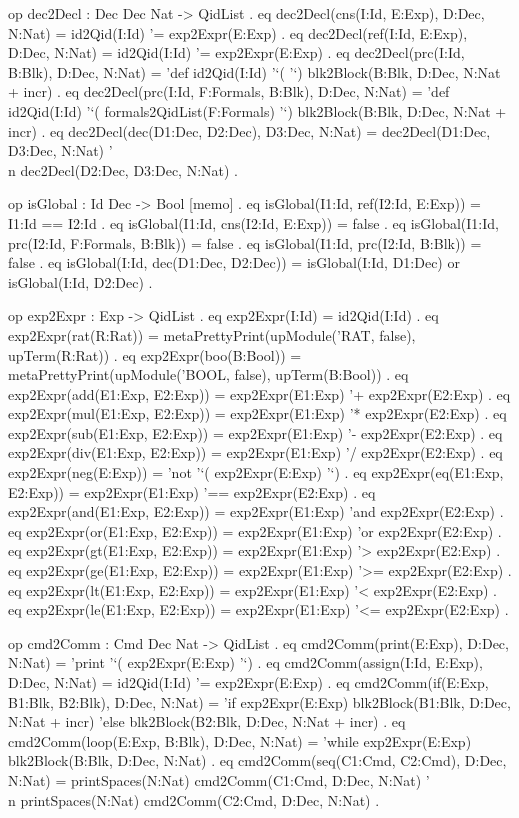 \documentclass{llncs}%
\begin{document}
    op dec2Decl : Dec Dec Nat -> QidList .
    eq dec2Decl(cns(I:Id, E:Exp), D:Dec, N:Nat) = 
       id2Qid(I:Id) '= exp2Expr(E:Exp) .
    eq dec2Decl(ref(I:Id, E:Exp), D:Dec, N:Nat) = 
       id2Qid(I:Id) '= exp2Expr(E:Exp) .
    eq dec2Decl(prc(I:Id, B:Blk), D:Dec, N:Nat) = 
       'def id2Qid(I:Id) '`( '`) 
       blk2Block(B:Blk, D:Dec, N:Nat + incr) .
    eq dec2Decl(prc(I:Id, F:Formals, B:Blk), D:Dec, N:Nat) = 
       'def id2Qid(I:Id) '`( formals2QidList(F:Formals) '`)  
       blk2Block(B:Blk, D:Dec, N:Nat + incr) .
    eq dec2Decl(dec(D1:Dec, D2:Dec), D3:Dec, N:Nat) =    
       dec2Decl(D1:Dec, D3:Dec, N:Nat) '\\n
       dec2Decl(D2:Dec, D3:Dec, N:Nat) . 
       
    op isGlobal : Id Dec -> Bool [memo] .     
    eq isGlobal(I1:Id, ref(I2:Id, E:Exp)) = I1:Id == I2:Id .
    eq isGlobal(I1:Id, cns(I2:Id, E:Exp)) = false .
    eq isGlobal(I1:Id, prc(I2:Id, F:Formals, B:Blk)) = false .
    eq isGlobal(I1:Id, prc(I2:Id, B:Blk)) = false .
    eq isGlobal(I:Id, dec(D1:Dec, D2:Dec)) = 
       isGlobal(I:Id, D1:Dec) or isGlobal(I:Id, D2:Dec) .
       
    op exp2Expr : Exp -> QidList .
    eq exp2Expr(I:Id) = id2Qid(I:Id) .   
    eq exp2Expr(rat(R:Rat)) = 
       metaPrettyPrint(upModule('RAT, false), upTerm(R:Rat)) . 
    eq exp2Expr(boo(B:Bool)) = 
       metaPrettyPrint(upModule('BOOL, false), upTerm(B:Bool)) . 
    eq exp2Expr(add(E1:Exp, E2:Exp)) = 
       exp2Expr(E1:Exp) '+ exp2Expr(E2:Exp) .    
    eq exp2Expr(mul(E1:Exp, E2:Exp)) = 
       exp2Expr(E1:Exp) '* exp2Expr(E2:Exp) .    
    eq exp2Expr(sub(E1:Exp, E2:Exp)) = 
       exp2Expr(E1:Exp) '- exp2Expr(E2:Exp) .    
    eq exp2Expr(div(E1:Exp, E2:Exp)) = 
       exp2Expr(E1:Exp) '/ exp2Expr(E2:Exp) .    
    eq exp2Expr(neg(E:Exp)) = 
       'not '`( exp2Expr(E:Exp) '`) .   
    eq exp2Expr(eq(E1:Exp, E2:Exp)) = 
       exp2Expr(E1:Exp) '== exp2Expr(E2:Exp) .    
    eq exp2Expr(and(E1:Exp, E2:Exp)) = 
       exp2Expr(E1:Exp) 'and exp2Expr(E2:Exp) .    
    eq exp2Expr(or(E1:Exp, E2:Exp)) = 
       exp2Expr(E1:Exp) 'or exp2Expr(E2:Exp) .    
    eq exp2Expr(gt(E1:Exp, E2:Exp)) = 
       exp2Expr(E1:Exp) '> exp2Expr(E2:Exp) .    
    eq exp2Expr(ge(E1:Exp, E2:Exp)) = 
       exp2Expr(E1:Exp) '>= exp2Expr(E2:Exp) .    
    eq exp2Expr(lt(E1:Exp, E2:Exp)) = 
       exp2Expr(E1:Exp) '< exp2Expr(E2:Exp) .    
    eq exp2Expr(le(E1:Exp, E2:Exp)) = 
       exp2Expr(E1:Exp) '<= exp2Expr(E2:Exp) .  
    
    op cmd2Comm : Cmd Dec Nat -> QidList .
    eq cmd2Comm(print(E:Exp), D:Dec, N:Nat) = 
       'print '`( exp2Expr(E:Exp) '`) . 
    eq cmd2Comm(assign(I:Id, E:Exp), D:Dec, N:Nat) = 
       id2Qid(I:Id) '= exp2Expr(E:Exp) . 
    eq cmd2Comm(if(E:Exp, B1:Blk, B2:Blk), D:Dec, N:Nat) = 
       'if exp2Expr(E:Exp)  
       blk2Block(B1:Blk, D:Dec, N:Nat + incr) 
       'else    
       blk2Block(B2:Blk, D:Dec, N:Nat + incr) .
    eq cmd2Comm(loop(E:Exp, B:Blk), D:Dec, N:Nat) = 
       'while exp2Expr(E:Exp)
       blk2Block(B:Blk, D:Dec, N:Nat) .
    eq cmd2Comm(seq(C1:Cmd, C2:Cmd), D:Dec, N:Nat) = 
       printSpaces(N:Nat)
       cmd2Comm(C1:Cmd, D:Dec, N:Nat) '\\n
       printSpaces(N:Nat)
       cmd2Comm(C2:Cmd, D:Dec, N:Nat) .
       
\end{document}
